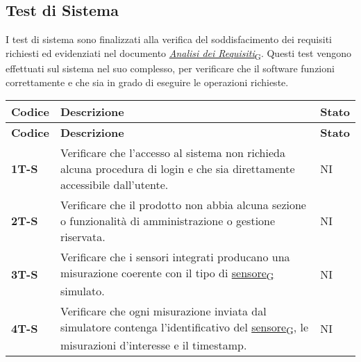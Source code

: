 \subsection{Test di Sistema}
I test di sistema sono finalizzati alla verifica del soddisfacimento dei requisiti richiesti ed evidenziati nel documento \href{https://7last.github.io/docs/rtb/documentazione-esterna/analisi-dei-requisiti}{\href{https://7last.github.io/docs/rtb/documentazione-interna/glossario\#analisi-dei-requisiti}{\textit{Analisi dei Requisiti}\textsubscript{G}}}. Questi test vengono effettuati sul sistema nel suo complesso, per verificare che il software funzioni correttamente e che sia in grado di eseguire le operazioni richieste. \\
\begin{longtable}{|>{\raggedright\arraybackslash}m{}|>{\raggedright\arraybackslash}m{}|>{\raggedright\arraybackslash}m{}|}
	\hline
	\textbf{Codice} & \textbf{Descrizione}                                                                                                                                                                             & \textbf{Stato} \\
	\hline
	\endfirsthead
	\hline
	\textbf{Codice} & \textbf{Descrizione}                                                                                                                                                                             & \textbf{Stato} \\
	\endhead
	\textbf{1T-S}   & Verificare che l'accesso al sistema non richieda alcuna procedura di login e che sia direttamente accessibile dall'utente.                                                                       & NI             \\
	\hline
	\textbf{2T-S}   & Verificare che il prodotto non abbia alcuna sezione o funzionalità di amministrazione o gestione riservata.                                                                                      & NI             \\
	\hline
	\textbf{3T-S}   & Verificare che i sensori integrati producano una misurazione coerente con il tipo di \href{https://7last.github.io/docs/rtb/documentazione-interna/glossario\#sensore}{sensore\textsubscript{G}} simulato.                                                                                           & NI             \\
	\hline
	\textbf{4T-S}   & Verificare che ogni misurazione inviata dal simulatore contenga l’identificativo del \href{https://7last.github.io/docs/rtb/documentazione-interna/glossario\#sensore}{sensore\textsubscript{G}}, le misurazioni d'interesse e il timestamp.                                                         & NI             \\

\end{longtable}
